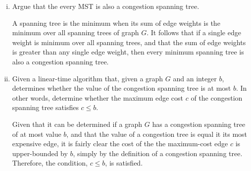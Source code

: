 \documentclass[12pt]{article}
\begin{document}
\begin{enumerate}[(a)]
\begin{enumerate}[i.]
\item Argue that the every MST is also a congestion spanning tree.
\begin{addmargin}[4em]{2em}
A spanning tree is the minimum when its sum of edge weights is the minimum over all spanning trees of graph $G$. It follows that if a single edge weight is minimum over all spanning trees, and that the sum of edge weights is greater than any single edge weight, then every minimum spanning tree is also a congestion spanning tree.
\end{addmargin}
\item Given a linear-time algorithm that, given a graph $G$ and an integer $b$, determines whether the value of the congestion spanning tree is at most $b$. In other words, determine whether the maximum edge cost $c$ of the congestion spanning tree satisfies $c \leq b$.
\begin{addmargin}[4em]{2em}
Given that it can be determined if a graph $G$ has a congestion spanning tree of at most value $b$, and that the value of a congestion tree is equal it its most expensive edge, it is fairly clear the cost of the the maximum-cost edge $c$ is upper-bounded by $b$, simply by the definition of a congestion spanning tree. Therefore, the condition, $c \leq b$, is satisfied.
\end{addmargin}
\end{enumerate}
\end{enumerate}
\end{document}
